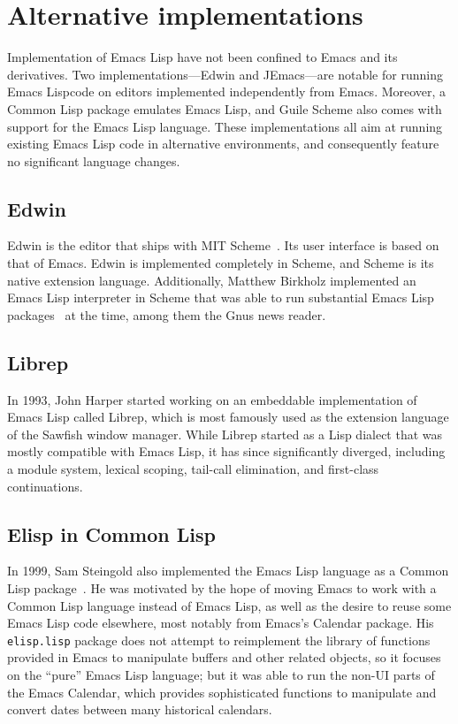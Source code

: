 \documentclass[format=acmsmall, review]{acmart}
\newcommand \Elisp {Emacs Lisp}
\begin{document}
\appendix

\section{Alternative implementations}
\label{sec:alternative-implementations}

Implementation of \Elisp{} have not been confined to Emacs and its
derivatives.  Two imp\-lemen\-tations---Edwin and JEmacs---are notable for
running \Elisp code on editors implemented independently from Emacs.
Moreover, a Common Lisp package emulates Emacs Lisp, and Guile Scheme
also comes with support for the \Elisp{} language.
These implementations all aim at running existing \Elisp{}
code in alternative environments, and consequently feature no
significant language changes.

\subsection{Edwin}

Edwin is the editor that ships with MIT Scheme~\cite{MITScheme2014}.
Its user interface is based on that of Emacs.  Edwin is implemented
completely in Scheme, and Scheme is its native extension language.
Additionally, Matthew Birkholz implemented an \Elisp{} interpreter
in Scheme that was able to run substantial \Elisp{}
packages~\cite{Birkholz1993} at the time, among them the Gnus news reader.

\subsection{Librep}

In 1993, John Harper started working on an embeddable implementation of
\Elisp{} called Librep, which is most famously used as the extension
language of the Sawfish window manager.  While Librep started as a Lisp
dialect that was mostly compatible with \Elisp{}, it has since significantly
diverged, including a module system, lexical scoping, tail-call elimination,
and first-class continuations.

\subsection{Elisp in Common Lisp}

In 1999, Sam Steingold also implemented the \Elisp{} language as a Common
Lisp package~\cite{Steingold99}.  He was motivated by the hope of moving
Emacs to work with a Common Lisp language instead of \Elisp{}, as well as
the desire to reuse some Emacs Lisp code elsewhere, most notably from
Emacs's Calendar package.  His \texttt{elisp.lisp} package does not attempt
to reimplement the library of functions provided in Emacs to manipulate
buffers and other related objects, so it focuses on the ``pure'' \Elisp{}
language; but it was able to run the non-UI parts of the Emacs Calendar,
which provides sophisticated functions to manipulate and convert dates
between many historical calendars.
\end{document}
